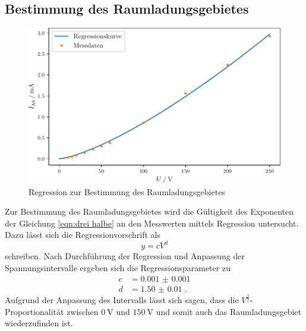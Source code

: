 \subsection{Bestimmung des Raumladungsgebietes}
\begin{figure}
    \centering
    \caption{Regression zur Bestimmung des Raumladungsgebietes}
    \label{fig:exponent}
    \includegraphics[width = \textwidth]{build/exponent.pdf}
\end{figure}
\noindent Zur Bestimmung des Raumladungsgebietes wird die Gültigkeit des Exponenten der Gleichung \eqref{eqn:drei halbe} an den Messwerten mittels Regression untersucht.
Dazu lässt sich die Regressionvorschrift als
\begin{equation}
    y = cV^d
\end{equation} 
schreiben.
Nach Durchführung der Regression und Anpassung der Spannungsintervalle ergeben sich die Regressionsparameter zu
\begin{align*}
    c & = \num{0.001(1)} \\ 
    d & = \num{1.50(1)} \; \text{.}
\end{align*}
Aufgrund der Anpassung des Intervalls lässt sich sagen, dass die $V^\frac{3}{2}$-Proportionalität zwischen $\SI{0}{\volt}$ und $\SI{150}{\volt}$ 
und somit auch das Raumladungsgebiet wiederzufinden ist.
